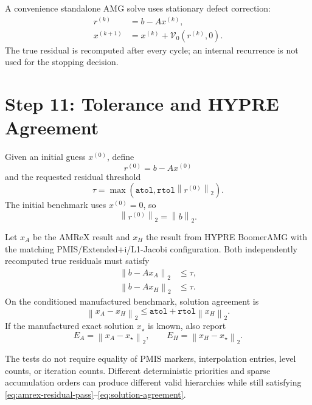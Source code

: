 \documentclass[11pt]{article}
\newcommand{\norm}[1]{\left\lVert #1 \right\rVert}
\begin{document}
A convenience standalone AMG solve uses stationary defect correction:
\begin{align}
  r^{(k)}
  &=
  b-Ax^{(k)},
  \label{eq:stationary-residual}\\
  x^{(k+1)}
  &=
  x^{(k)}+\mathcal V_0(r^{(k)},0).
  \label{eq:stationary-update}
\end{align}
The true residual is recomputed after every cycle; an internal recurrence is
not used for the stopping decision.

\section{Step 11: Tolerance and HYPRE Agreement}

Given an initial guess $x^{(0)}$, define
\begin{equation}
  r^{(0)}=b-Ax^{(0)}
  \label{eq:initial-residual}
\end{equation}
and the requested residual threshold
\begin{equation}
  \tau
  =
  \max\left(
    \mathtt{atol},
    \mathtt{rtol}\norm{r^{(0)}}_2
  \right).
  \label{eq:residual-target}
\end{equation}
The initial benchmark uses $x^{(0)}=0$, so
\begin{equation}
  \norm{r^{(0)}}_2=\norm b_2.
  \label{eq:zero-guess-residual}
\end{equation}

Let $x_A$ be the AMReX result and $x_H$ the result from HYPRE BoomerAMG with
the matching PMIS/Extended+i/L1-Jacobi configuration.  Both independently
recomputed true residuals must satisfy
\begin{align}
  \norm{b-Ax_A}_2
  &\leq\tau,
  \label{eq:amrex-residual-pass}\\
  \norm{b-Ax_H}_2
  &\leq\tau.
  \label{eq:hypre-residual-pass}
\end{align}
On the conditioned manufactured benchmark, solution agreement is
\begin{equation}
  \norm{x_A-x_H}_2
  \leq
  \mathtt{atol}
  +
  \mathtt{rtol}\norm{x_H}_2.
  \label{eq:solution-agreement}
\end{equation}
If the manufactured exact solution $x_\star$ is known, also report
\begin{equation}
  E_A=\norm{x_A-x_\star}_2,
  \qquad
  E_H=\norm{x_H-x_\star}_2.
  \label{eq:exact-solution-errors}
\end{equation}

The tests do not require equality of PMIS markers, interpolation entries,
level counts, or iteration counts.  Different deterministic priorities and
sparse accumulation orders can produce different valid hierarchies while
still satisfying \eqref{eq:amrex-residual-pass}--\eqref{eq:solution-agreement}.
\end{document}

